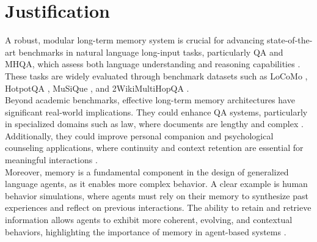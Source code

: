 \section{Justification}
\label{sec:justification}

A robust, modular long-term memory system is crucial for advancing state-of-the-art benchmarks in natural language long-input tasks, particularly QA and MHQA, which assess both language understanding and reasoning capabilities \cite{10.1561/1500000102}. These tasks are widely evaluated through benchmark datasets such as LoCoMo \cite{maharana-etal-2024-evaluating}, HotpotQA \cite{yang2018hotpotqa}, MuSiQue \cite{trivedi2021musique}, and 2WikiMultiHopQA \cite{ho-etal-2020-constructing}. \\

\noindent Beyond academic benchmarks, effective long-term memory architectures have significant real-world implications.  They could enhance QA systems, particularly in specialized domains such as law, where documents are lengthy and complex \cite{regnlp-ws-2025-1}. Additionally, they could improve personal companion and psychological counseling applications, where continuity and context retention are essential for meaningful interactions \cite{Zhong_Guo_Gao_Ye_Wang_2024}. \\ 

\noindent Moreover, memory is a fundamental component in the design of generalized language agents, as it enables more complex behavior. A clear example is human behavior simulations, where agents must rely on their memory to synthesize past experiences and reflect on previous interactions. The ability to retain and retrieve information allows agents to exhibit more coherent, evolving, and contextual behaviors, highlighting the importance of memory in agent-based systems \cite{10.1145/3586183.3606763}\cite{Hatalis_Christou_Myers_Jones_Lambert_Amos-Binks_Dannenhauer_Dannenhauer_2024}.  \\
